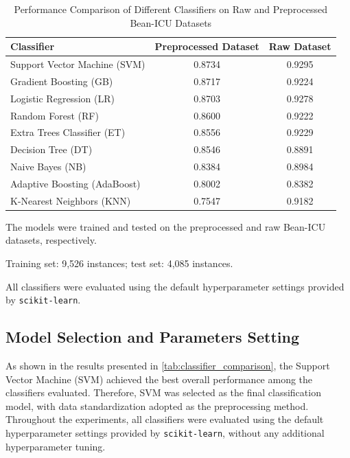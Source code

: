 \documentclass[10pt,a4paper]{article}
\begin{document}
	
	
	\begin{table}[htbp]
		\centering
		\caption{Performance Comparison of Different Classifiers on Raw and Preprocessed Bean-ICU Datasets}
		\label{tab:classifier_comparison}
		\begin{threeparttable}
			\begin{tabular}{lcc}
				\toprule
				\textbf{Classifier} & \textbf{Preprocessed Dataset} & \textbf{Raw Dataset} \\
				\midrule
				Support Vector Machine (SVM) & 0.8734 & 0.9295 \\
				Gradient Boosting (GB) & 0.8717 & 0.9224 \\
				Logistic Regression (LR) & 0.8703 & 0.9278 \\
				Random Forest (RF) & 0.8600 & 0.9222 \\
				Extra Trees Classifier (ET) & 0.8556 & 0.9229 \\
				Decision Tree (DT) & 0.8546 & 0.8891 \\
				Naive Bayes (NB) & 0.8384 & 0.8984 \\
				Adaptive Boosting (AdaBoost) & 0.8002 & 0.8382 \\
				K-Nearest Neighbors (KNN) & 0.7547 & 0.9182 \\
				\bottomrule
			\end{tabular}
			\begin{tablenotes}[flushleft]
				\footnotesize
				\item The models were trained and tested on the preprocessed and raw Bean-ICU datasets, respectively.
				\item Training set: 9,526 instances; test set: 4,085 instances.
				\item All classifiers were evaluated using the default hyperparameter settings provided by \texttt{scikit-learn}.
			\end{tablenotes}
		\end{threeparttable}
	\end{table}
	
	\subsection{Model Selection and Parameters Setting}
		As shown in the results presented in \autoref{tab:classifier_comparison}, the Support Vector Machine (SVM) achieved the best overall performance among the classifiers evaluated. Therefore, SVM was selected as the final classification model, with data standardization adopted as the preprocessing method. Throughout the experiments, all classifiers were evaluated using the default hyperparameter settings provided by \texttt{scikit-learn}, without any additional hyperparameter tuning.
		
\end{document}
